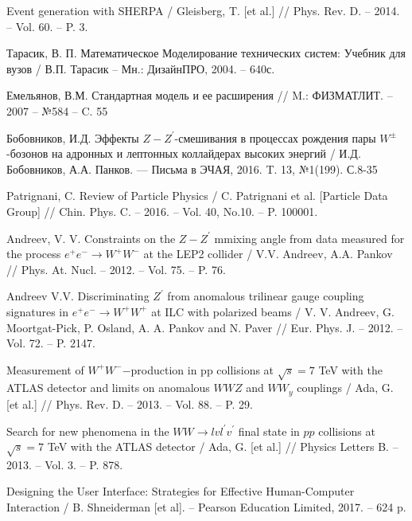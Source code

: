 	Event generation with SHERPA
	/ Gleisberg, T. [et al.]  
	// Phys. Rev. D. – 2014. – Vol. 60. – P. 3.

	Тарасик, В. П. Математическое Моделирование технических систем:
	Учебник для вузов / В.П. Тарасик – Мн.: ДизайнПРО‚ 2004. – 640с.

	
	Емельянов, В.М. Стандартная модель и ее расширения 
	// M.: ФИЗМАТЛИТ. -- 2007 – №584 – C. 55
	
	Бобовников, И.Д. Эффекты $Z-Z^\prime$-смешивания в процессах рождения пары $W^±$-бозонов на адронных и лептонных коллайдерах высоких энергий
	/ И.Д. Бобовников, А.А. Панков.
	— Письма в ЭЧАЯ, 2016. T. 13, №1(199). С.8-35
	
	Patrignani, C. Review of Particle Physics 
	/ C. Patrignani et al. [Particle Data Group]
	// Chin. Phys. C. – 2016. – Vol. 40, No.10. – P. 100001.
	

	Andreev, V. V. Constraints on the $Z-Z^\prime$ mmixing angle from data measured for the process $e^+e^- \rightarrow W^+W^-$ at the LEP2 collider
	/ V.V. Andreev, A.A. Pankov
	// Phys. At. Nucl. – 2012. – Vol. 75. – P. 76.
	
	Andreev V.V. Discriminating ${Z}^\prime$ from anomalous trilinear gauge coupling
	signatures in ${e}^{+}{e}^{-} \rightarrow {W}^{+}{W}^{+}$
	at ILC with polarized beams / V. V. Andreev, G.
	Moortgat-Pick, P. Osland, A. A. Pankov and N. Paver // Eur. Phys. J. – 2012. – Vol. 72. – P. 2147.

	Measurement of $W^+W^-$−production in pp collisions at $\sqrt{s}=7$ TeV with the ATLAS detector and limits on anomalous $WWZ$ and $WW_y$ couplings
	/ Ada, G. [et al.] 
	// Phys. Rev. D. – 2013. – Vol. 88. – P. 29.
	
	Search for new phenomena in the $WW \rightarrow lvl^{\prime}v^{\prime}$ final state in $pp$ collisions at $\sqrt{s}=7$ TeV with the ATLAS detector
	/ Ada, G. [et al.] 
	// Physics Letters B. – 2013. – Vol. 3. – P. 878.



	 
	 Designing the User Interface: Strategies for Effective Human-Computer
	 Interaction
	 / B. Shneiderman [et al]. – Pearson Education Limited, 2017. – 624 p. 

	 


	
	




